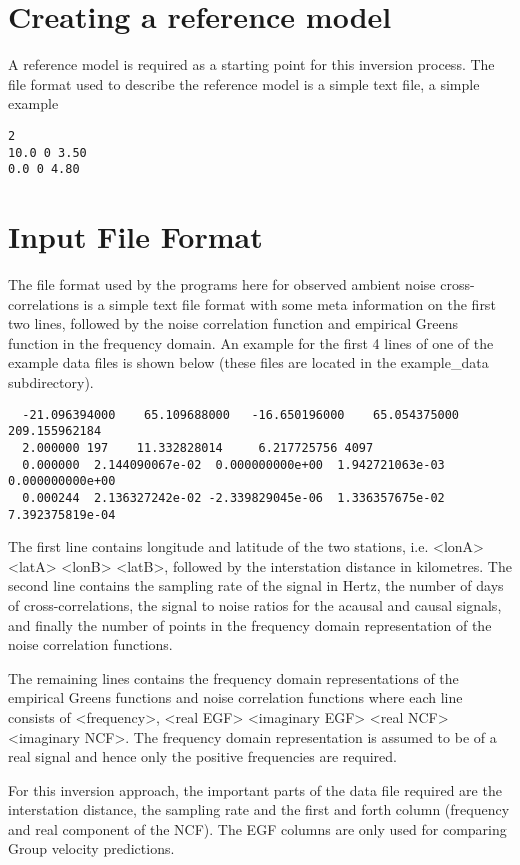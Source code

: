 \documentclass{article}
\begin{document}
\section{Creating a reference model}

A reference model is required as a starting point for this inversion process. The file format used
to describe the reference model is a simple text file, a simple example

\begin{verbatim}
2
10.0 0 3.50
0.0 0 4.80
\end{verbatim}



\section{Input File Format}

The file format used by the programs here for observed ambient noise
cross-correlations is a simple text file format with some meta
information on the first two lines, followed by the noise correlation
function and empirical Greens function in the frequency domain.  An
example for the first 4 lines of one of the example data files is
shown below (these files are located in the example\_data
subdirectory).

\begin{verbatim}
  -21.096394000    65.109688000   -16.650196000    65.054375000   209.155962184
  2.000000 197    11.332828014     6.217725756 4097
  0.000000  2.144090067e-02  0.000000000e+00  1.942721063e-03  0.000000000e+00
  0.000244  2.136327242e-02 -2.339829045e-06  1.336357675e-02  7.392375819e-04
\end{verbatim}

The first line contains longitude and latitude of the two stations,
i.e. <lonA> <latA> <lonB> <latB>, followed by the interstation
distance in kilometres. The second line contains the sampling rate of
the signal in Hertz, the number of days of cross-correlations, the
signal to noise ratios for the acausal and causal signals, and finally
the number of points in the frequency domain representation of the
noise correlation functions.

The remaining lines contains the frequency domain representations of
the empirical Greens functions and noise correlation functions where
each line consists of <frequency>, <real EGF> <imaginary EGF> <real
NCF> <imaginary NCF>. The frequency domain representation is assumed
to be of a real signal and hence only the positive frequencies are
required.

For this inversion approach, the important parts of the data file
required are the interstation distance, the sampling rate and the
first and forth column (frequency and real component of the NCF). The
EGF columns are only used for comparing Group velocity predictions.
\end{document}
